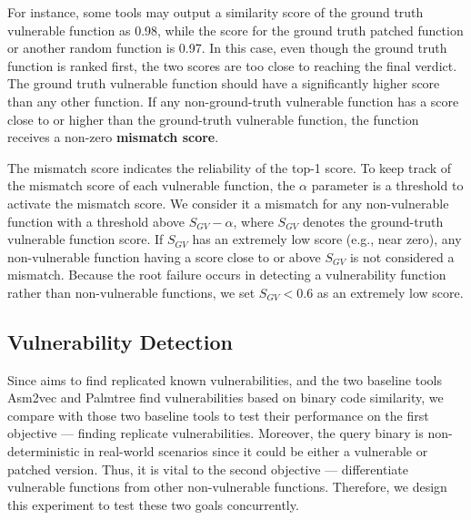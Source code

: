 For instance, some tools may output a similarity score of the ground truth vulnerable function as 0.98, while the score for the ground truth patched function or another random function is 0.97. 
In this case, even though the ground truth function is ranked first, the two scores are too close to reaching the final verdict. 
The ground truth vulnerable function should have a significantly higher score than any other function. 
If any non-ground-truth vulnerable function has a score close to or higher than the ground-truth vulnerable function, the function receives a non-zero \textbf{mismatch score}. 


The mismatch score indicates the reliability of the top-1 score.
To keep track of the mismatch score of each vulnerable function, the $\alpha$ parameter is a threshold to activate the mismatch score. 
We consider it a mismatch for any non-vulnerable function with a threshold above $S_{GV}-\alpha$, where $S_{GV}$ denotes the ground-truth vulnerable function score.  
If $S_{GV}$ has an extremely low score (e.g., near zero), any non-vulnerable function having a score close to or above $S_{GV}$ is not considered a mismatch. 
Because the root failure occurs in detecting a vulnerability function rather than non-vulnerable functions, we set $S_{GV} < 0.6$ as an extremely low score.

\subsection{Vulnerability Detection}
Since \name aims to find replicated known vulnerabilities, and the two baseline tools Asm2vec and Palmtree find vulnerabilities based on binary code similarity, we compare \name with those two baseline tools to test their performance on the first objective --- finding replicate vulnerabilities. 
Moreover, the query binary is non-deterministic in real-world scenarios since it could be either a vulnerable or patched version. 
Thus, it is vital to the second objective --- differentiate vulnerable functions from other non-vulnerable functions. 
Therefore, we design this experiment to test these two goals concurrently. 



